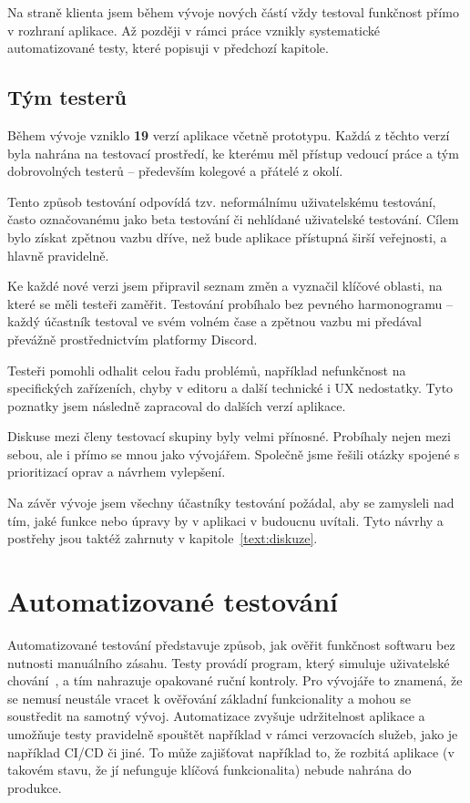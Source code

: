 Na straně klienta jsem během vývoje nových částí vždy testoval funkčnost přímo v rozhraní aplikace.
Až později v rámci práce vznikly systematické automatizované testy, které popisuji v předchozí kapitole.

\subsection{Tým testerů}

Během vývoje vzniklo \textbf{19} verzí aplikace včetně prototypu. 
Každá z těchto verzí byla nahrána na testovací prostředí, ke kterému měl přístup vedoucí práce a tým dobrovolných testerů -- především kolegové a přátelé z okolí.

Tento způsob testování odpovídá tzv. neformálnímu uživatelskému testování, často označovanému jako beta testování či nehlídané uživatelské testování. 
Cílem bylo získat zpětnou vazbu dříve, než bude aplikace přístupná širší veřejnosti, a hlavně pravidelně.

Ke každé nové verzi jsem připravil seznam změn a vyznačil klíčové oblasti, na které se měli testeři zaměřit. 
Testování probíhalo bez pevného harmonogramu -- každý účastník testoval ve svém volném čase a zpětnou vazbu mi předával převážně prostřednictvím platformy Discord.

Testeři pomohli odhalit celou řadu problémů, například nefunkčnost na specifických zařízeních, chyby v editoru a další technické i UX nedostatky. 
Tyto poznatky jsem následně zapracoval do dalších verzí aplikace.

Diskuse mezi členy testovací skupiny byly velmi přínosné.
Probíhaly nejen mezi sebou, ale i přímo se mnou jako vývojářem. 
Společně jsme řešili otázky spojené s prioritizací oprav a návrhem vylepšení.

Na závěr vývoje jsem všechny účastníky testování požádal, aby se zamysleli nad tím, jaké funkce nebo úpravy by v aplikaci v budoucnu uvítali. 
Tyto návrhy a postřehy jsou taktéž zahrnuty v kapitole~\ref{text:diskuze}.

\section{Automatizované testování}

Automatizované testování představuje způsob, jak ověřit funkčnost softwaru bez nutnosti manuálního zásahu.
Testy provádí program, který simuluje uživatelské chování~\cite{meszaros_2007}, a tím nahrazuje opakované ruční kontroly.
Pro vývojáře to znamená, že se nemusí neustále vracet k ověřování základní funkcionality a mohou se soustředit na samotný vývoj. 
Automatizace zvyšuje udržitelnost aplikace a umožňuje testy pravidelně spouštět například v rámci verzovacích služeb, jako je například CI/CD či jiné.
To může zajišťovat například to, že rozbitá aplikace (v takovém stavu, že jí nefunguje klíčová funkcionalita) nebude nahrána do produkce.


